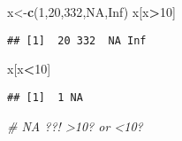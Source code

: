 \documentclass[]{article}
\newenvironment{Shaded}{\begin{snugshade}}{\end{snugshade}}
\newcommand{\CommentTok}[1]{\textcolor[rgb]{0.56,0.35,0.01}{\textit{#1}}}
\newcommand{\DecValTok}[1]{\textcolor[rgb]{0.00,0.00,0.81}{#1}}
\newcommand{\KeywordTok}[1]{\textcolor[rgb]{0.13,0.29,0.53}{\textbf{#1}}}
\newcommand{\NormalTok}[1]{#1}
\newcommand{\OperatorTok}[1]{\textcolor[rgb]{0.81,0.36,0.00}{\textbf{#1}}}
\newcommand{\OtherTok}[1]{\textcolor[rgb]{0.56,0.35,0.01}{#1}}
\begin{document}
\begin{Shaded}
\begin{Highlighting}[]
\NormalTok{x<-}\KeywordTok{c}\NormalTok{(}\DecValTok{1}\NormalTok{,}\DecValTok{20}\NormalTok{,}\DecValTok{332}\NormalTok{,}\OtherTok{NA}\NormalTok{,}\OtherTok{Inf}\NormalTok{)}
\NormalTok{x[x}\OperatorTok{>}\DecValTok{10}\NormalTok{]}
\end{Highlighting}
\end{Shaded}

\begin{verbatim}
## [1]  20 332  NA Inf
\end{verbatim}

\begin{Shaded}
\begin{Highlighting}[]
\NormalTok{x[x}\OperatorTok{<}\DecValTok{10}\NormalTok{]}
\end{Highlighting}
\end{Shaded}

\begin{verbatim}
## [1]  1 NA
\end{verbatim}

\begin{Shaded}
\begin{Highlighting}[]
\CommentTok{# NA ??!  >10? or <10?}
\end{Highlighting}
\end{Shaded}
\end{document}
